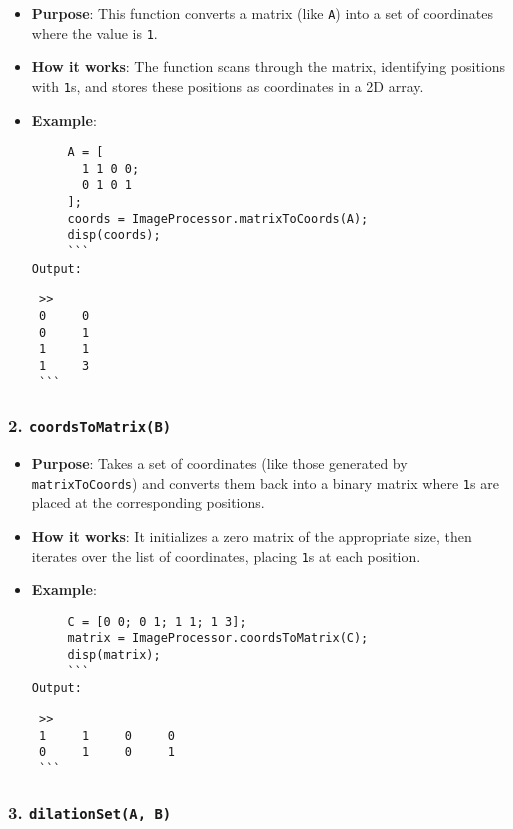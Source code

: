 \documentclass[11pt]{amsart}
\theoremstyle{remark}
\theoremstyle{definition}
\theoremstyle{remark}
\numberwithin{equation}{section}
\begin{document}
\begin{itemize}
\item
  \textbf{Purpose}: This function converts a matrix (like \texttt{A})
  into a set of coordinates where the value is \texttt{1}.
\item
  \textbf{How it works}: The function scans through the matrix,
  identifying positions with \texttt{1}s, and stores these positions as
  coordinates in a 2D array.
\item
  \textbf{Example}:

\begin{verbatim}
     A = [
       1 1 0 0;
       0 1 0 1
     ];
     coords = ImageProcessor.matrixToCoords(A);
     disp(coords);
     ```
Output:
\end{verbatim}

\begin{verbatim}
 >> 
 0     0
 0     1
 1     1
 1     3
 ```
\end{verbatim}
\end{itemize}

\subsubsection{\texorpdfstring{2.
\textbf{\texttt{coordsToMatrix(B)}}}{2. coordsToMatrix(B)}}\label{coordstomatrixb}

\begin{itemize}
\item
  \textbf{Purpose}: Takes a set of coordinates (like those generated by
  \texttt{matrixToCoords}) and converts them back into a binary matrix
  where \texttt{1}s are placed at the corresponding positions.
\item
  \textbf{How it works}: It initializes a zero matrix of the appropriate
  size, then iterates over the list of coordinates, placing \texttt{1}s
  at each position.
\item
  \textbf{Example}:

\begin{verbatim}
     C = [0 0; 0 1; 1 1; 1 3];
     matrix = ImageProcessor.coordsToMatrix(C);
     disp(matrix);
     ```
Output:
\end{verbatim}

\begin{verbatim}
 >> 
 1     1     0     0
 0     1     0     1
 ```
\end{verbatim}
\end{itemize}

\subsubsection{\texorpdfstring{3.
\textbf{\texttt{dilationSet(A,\ B)}}}{3. dilationSet(A, B)}}\label{dilationseta-b}
\end{document}
